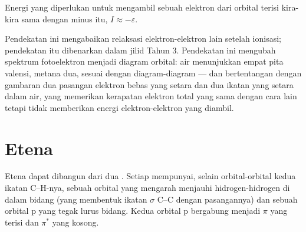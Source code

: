\begin{proposition}\label{prop:b2:fragment-orbitals:koopmans}
Energi yang diperlukan untuk mengambil sebuah elektron dari orbital terisi
kira-kira sama dengan minus  itu, $I \approx -\varepsilon$.
\end{proposition}

\admitted

Pendekatan ini mengabaikan relaksasi elektron-elektron lain setelah
ionisasi; pendekatan itu dibenarkan dalam jilid Tahun 3. Pendekatan ini
mengubah spektrum fotoelektron menjadi diagram orbital: air menunjukkan
empat pita valensi, metana dua, sesuai dengan diagram-diagram  ---
dan bertentangan dengan gambaran dua pasangan elektron bebas yang setara
dan dua ikatan yang setara dalam air, yang memerikan kerapatan elektron
total yang sama dengan cara lain tetapi tidak memberikan energi
elektron-elektron yang diambil.

\section{Etena}

Etena dapat dibangun dari dua  . Setiap  mempunyai,
selain orbital-orbital kedua ikatan C--H-nya, sebuah orbital yang mengarah
menjauhi hidrogen-hidrogen di dalam bidang (yang membentuk ikatan $\sigma$
C--C dengan pasangannya) dan sebuah orbital p yang tegak lurus bidang.
Kedua orbital p bergabung menjadi $\pi$ yang terisi dan $\pi^*$ yang
kosong.

